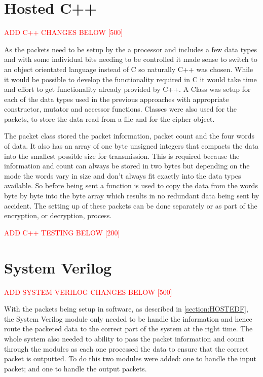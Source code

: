 \documentclass[12pt,twoside,a4paper]{report}
\begin{document}
	\section{Hosted C++}
	\label{section:HOSTEDF}
    
	\textcolor{red}{ADD C++ CHANGES BELOW [500]}
    
	As the packets need to be setup by the a processor and includes a few data types and with some individual bits needing to be controlled it made sense to switch to an object orientated language instead of C so naturally C++ was chosen. While it would be possible to develop the functionality required in C it would take time and effort to get functionality already provided by C++. A Class was setup for each of the data types used in the previous approaches with appropriate constructor, mutator and accessor functions. Classes were also used for the packets, to store the data read from a file and for the cipher object.
    
   	The packet class stored the packet information, packet count and the four words of data. It also has an array of one byte unsigned integers that compacts the data into the smallest possible size for transmission. This is required because the information and count can always be stored in two bytes but depending on the mode the words vary in size and don't always fit exactly into the data types available. So before being sent a function is used to copy the data from the words byte by byte into the byte array which results in no redundant data being sent by accident. The setting up of these packets can be done separately or as part of the encryption, or decryption, process.
    
	\textcolor{red}{ADD C++ TESTING BELOW [200]} 
    
	\section{System Verilog}
	\label{section:SVF}
    
	\textcolor{red}{ADD SYSTEM VERILOG CHANGES BELOW [500]}
	
	With the packets being setup in software, as described in \autoref{section:HOSTEDF}, the System Verilog module only needed to be handle the information and hence route the packeted data to the correct part of the system at the right time. The whole system also needed to ability to pass the packet information and count through the modules as each one processed the data to ensure that the correct packet is outputted. To do this two modules were added: one to handle the input packet; and one to handle the output packets.
    
\end{document}
